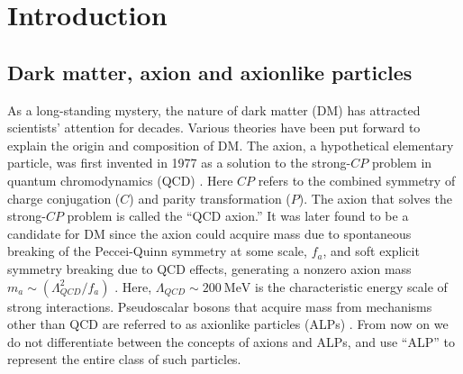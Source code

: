 
\section{Introduction}\label{sec:introduction}

\subsection{Dark matter, axion and axionlike particles}

As a long-standing mystery, the nature of dark matter (DM) has attracted scientists' attention for decades. Various theories have been put forward to explain the origin and composition of DM. 
The axion, a hypothetical elementary particle, was first invented in 1977 as a solution to the strong-$CP$ problem in quantum chromodynamics (QCD) \cite{IRASTORZA201889, Peccei_PhysRevLett.38.1440, Weinberg_PhysRevLett.40.223, Wilczek_PhysRevLett.40.279, DeMille_doi:10.1126/science.aal3003}.
Here $CP$ refers to the combined symmetry of charge conjugation ($C$) and parity transformation ($P$). 
The axion that solves the strong-$CP$ problem is called the ``QCD axion.'' 
It was later found to be a candidate for DM since the axion could acquire mass %
due to spontaneous breaking of the Peccei-Quinn symmetry at some scale, $f_a$, and soft explicit symmetry breaking due to QCD effects, 
generating a nonzero axion mass $m_a \sim (\Lambda_{QCD}^2/f_a)$ \cite{Kimball2022search}. 
Here, $\Lambda_{QCD}\sim \SI{200}{\MeV}$ \cite{Dzuba_2002_PhysRevA, Baldicchi_2007_PhysRevLett} is the characteristic energy scale of strong interactions. Pseudoscalar bosons that acquire mass from mechanisms other than QCD are referred to as axionlike particles (ALPs) \cite{IRASTORZA201889, Graham_doi:10.1146/annurev-nucl-102014-022120, Sikivie_RevModPhys.93.015004}. From now on we do not differentiate between the concepts of axions and ALPs, and use ``ALP'' to represent the entire class of such particles. 


